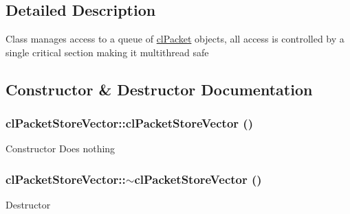 \subsection{Detailed Description}
Class manages access to a queue of \hyperlink{classcl_packet}{clPacket} objects, all access is controlled by a single critical section making it multithread safe 

\subsection{Constructor \& Destructor Documentation}
\hypertarget{classcl_packet_store_vector_ae0469040a6e98410ea98ce70811fbc1e}{
\subsubsection[{clPacketStoreVector}]{\setlength{\rightskip}{0pt plus 5cm}clPacketStoreVector::clPacketStoreVector ()}}
\label{classcl_packet_store_vector_ae0469040a6e98410ea98ce70811fbc1e}
Constructor Does nothing \hypertarget{classcl_packet_store_vector_a1b41714f0b74042b8666dadcff99cfb1}{
\subsubsection[{$\sim$clPacketStoreVector}]{\setlength{\rightskip}{0pt plus 5cm}clPacketStoreVector::$\sim$clPacketStoreVector ()}}
\label{classcl_packet_store_vector_a1b41714f0b74042b8666dadcff99cfb1}
Destructor 

